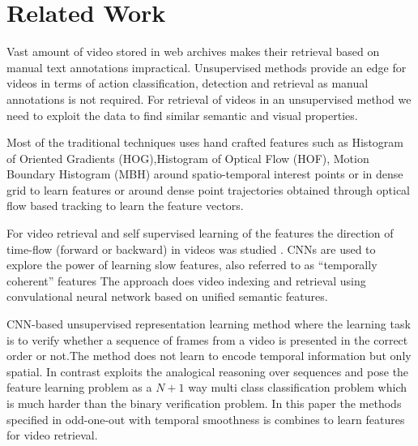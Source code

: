 \section{Related Work}\label{sec:related}
Vast amount of video stored in web archives makes their retrieval based on manual text annotations impractical.
Unsupervised methods provide an edge for videos in terms of action classification, detection and retrieval as manual annotations is not required. 
For retrieval of videos in an unsupervised method we need to exploit the data to find similar semantic and visual properties.

Most of the traditional techniques uses hand crafted features such as Histogram of Oriented Gradients (HOG),Histogram of Optical Flow (HOF), Motion Boundary Histogram
(MBH) around spatio-temporal interest points \cite{Laptev08learningrealistic} or in dense grid to learn features or around dense point trajectories obtained through optical flow based tracking to learn the feature vectors. 

For video retrieval and self supervised learning of the features the direction of time-flow (forward or backward) in videos was studied \cite{Pickupetal14}. CNNs are used to explore the power of learning
slow features, also referred to as “temporally coherent” features\cite{Mobahi2009}
The approach\cite{podlesnaya2016retrieval} does video indexing and retrieval using convulational neural network  based on unified semantic features.

CNN-based unsupervised representation learning method \cite{Misra2016ShuffleAL}where the learning task is to verify whether a sequence
of frames from a video is presented in the correct order or
not.The method does not learn to encode temporal
information but only spatial. In contrast \cite{fernando2017self}
exploits the analogical reasoning over sequences and pose
the feature learning problem as a  $ N + 1 $ way multi class
classification problem which is much harder than the binary
verification problem. In this paper the methods specified in odd-one-out \cite{fernando2017self} with temporal smoothness is combines to learn features for video retrieval.